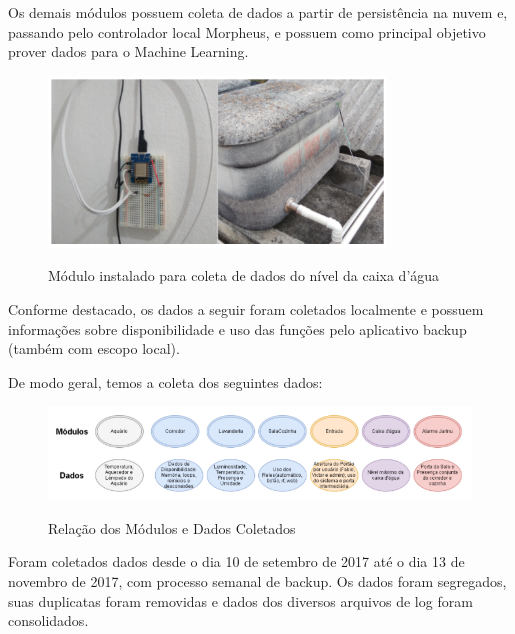 Os demais módulos possuem coleta de dados a partir de persistência na nuvem e, passando pelo controlador local Morpheus, e possuem como principal objetivo prover dados para o Machine Learning.

\begin{figure}[H]
	\centering
	\caption{Módulo instalado para coleta de dados do nível da caixa d’água}
	\includegraphics[width=0.8\textwidth]{ModuloCxAgua}
	\label{fig:ModuloCxAgua}
\end{figure}

Conforme destacado, os dados a seguir foram coletados localmente e possuem informações sobre disponibilidade e uso das funções pelo aplicativo backup (também com escopo local).

De modo geral, temos a coleta dos seguintes dados:

\begin{figure}[H]
	\centering
	\caption{Relação dos Módulos e Dados Coletados}
	\includegraphics[width=1.0\textwidth]{DiagramaModulosDados}
	\label{fig:DiagramaModulosDados}
\end{figure}

Foram coletados dados desde o dia 10 de setembro de 2017 até o dia 13 de novembro de 2017, com processo semanal de backup. Os dados foram segregados, suas duplicatas foram removidas e dados dos diversos arquivos de log foram consolidados.

